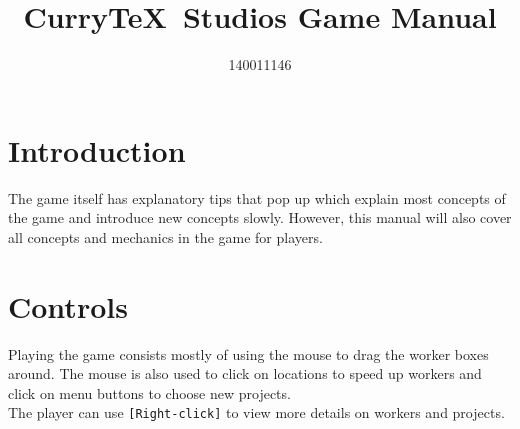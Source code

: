 \documentclass[11pt]{article}
\author{140011146}
\title{Curry\TeX\ Studios Game Manual}
\newcommand{\n}[0]{\\[\baselineskip]}
\begin{document}
\maketitle

\section{Introduction}
The game itself has explanatory tips that pop up which explain most concepts of the game and introduce new concepts slowly. However, this manual will also cover all concepts and mechanics in the game for players.

\section{Controls}
Playing the game consists mostly of using the mouse to drag the worker boxes around. The mouse is also used to click on locations to speed up workers and click on menu buttons to choose new projects. 
\n
The player can use \texttt{[Right-click]} to view more details on workers and projects. 
\end{document}
